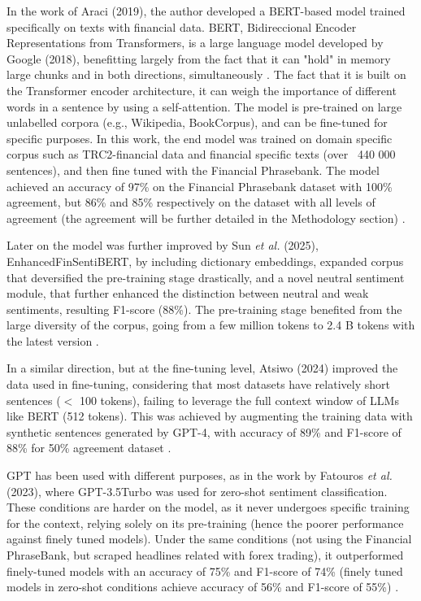\documentclass[conference]{IEEEtran}
\begin{document}
In the work of Araci (2019), the author developed a BERT-based model trained specifically on texts with financial data. BERT, Bidireccional Encoder Representations from Transformers, is a large language model developed by Google (2018), benefitting largely from the fact that it can "hold" in memory large chunks and in both directions, simultaneously \cite{devlin2019bert}. The fact that it is built on the Transformer encoder architecture, it can weigh the importance of different words in a sentence by using a self-attention. The model is pre-trained  on large unlabelled corpora (e.g., Wikipedia, BookCorpus), and can be fine-tuned for specific purposes. In this work, the end model was trained on  domain specific corpus such as TRC2-financial data and financial specific texts (over ~440 000 sentences), and then fine tuned with the Financial Phrasebank. The model achieved an accuracy of 97\% on the Financial Phrasebank dataset with 100\% agreement, but 86\% and 85\% respectively on the dataset with all levels of agreement (the agreement will be further detailed in the Methodology section) \cite{araci2019finbert}. 

Later on the model was further improved by Sun \textit{et al.} (2025), EnhancedFinSentiBERT, by including dictionary embeddings, expanded corpus that deversified the pre-training stage drastically, and a novel neutral sentiment module, that further enhanced the distinction between neutral and weak sentiments, resulting F1-score (88\%). The pre-training stage benefited from the large diversity of the corpus, going from a few million tokens to 2.4 B tokens with the latest version \cite{sun2025financial}.

In a similar direction, but at the fine-tuning level, Atsiwo (2024) improved the data used in fine-tuning, considering that most datasets have relatively short sentences ($<$ 100 tokens), failing to leverage the full context window  of LLMs like BERT (512 tokens). This was achieved by augmenting  the training data with synthetic sentences generated by GPT-4, with accuracy of 89\% and F1-score of 88\% for 50\% agreement dataset \cite{atsiwo2024financial}. 

GPT has been used with different purposes, as in the work by Fatouros \textit{et al.} (2023), where GPT-3.5Turbo was used for zero-shot sentiment classification. These conditions are harder on the model, as it never undergoes specific training for the context, relying solely on its pre-training (hence the poorer performance against finely tuned models). Under the same conditions (not using the Financial PhraseBank, but scraped headlines related with forex trading), it outperformed finely-tuned models with an accuracy of 75\% and F1-score of 74\% (finely tuned models in zero-shot conditions achieve accuracy of 56\% and F1-score of 55\%) \cite{fatouros2023chatgpt}.
\end{document}
